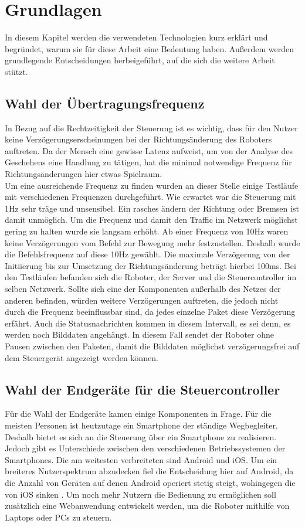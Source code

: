 \chapter{Grundlagen}
\label{ch:Grundlagen}

In diesem Kapitel werden die verwendeten Technologien kurz erklärt und begründet, warum sie für diese Arbeit eine Bedeutung haben. Außerdem werden grundlegende Entscheidungen herbeigeführt, auf die sich die weitere Arbeit stützt.

\section{Wahl der Übertragungsfrequenz}
In Bezug auf die Rechtzeitigkeit der Steuerung ist es wichtig, dass für den Nutzer keine Verzögerungserscheinungen bei der Richtungsänderung des Roboters auftreten. Da der Mensch eine gewisse Latenz aufweist, um von der Analyse des Geschehens eine Handlung zu tätigen, hat die minimal notwendige Frequenz für Richtungsänderungen hier etwas Spielraum. \\
Um eine ausreichende Frequenz zu finden wurden an dieser Stelle einige Testläufe mit verschiedenen Frequenzen durchgeführt. Wie erwartet war die Steuerung mit 1Hz sehr träge und unsensibel. Ein rasches ändern der Richtung oder Bremsen ist damit unmöglich. Um die Frequenz und damit den Traffic im Netzwerk möglichst gering zu halten wurde sie langsam erhöht. Ab einer Frequenz von 10Hz waren keine Verzögerungen vom Befehl zur Bewegung mehr festzustellen. Deshalb wurde die Befehlsfrequenz auf diese 10Hz gewählt. Die maximale Verzögerung von der Initiierung bis zur Umsetzung der Richtungsänderung beträgt hierbei 100ms. Bei den Testläufen befanden sich die Roboter, der Server und die Steuercontroller im selben Netzwerk. Sollte sich eine der Komponenten außerhalb des Netzes der anderen befinden, würden weitere Verzögerungen auftreten, die jedoch nicht durch die Frequenz beeinflussbar sind, da jedes einzelne Paket diese Verzögerung erfährt. Auch die Statusnachrichten kommen in diesem Intervall, es sei denn, es werden noch Bilddaten angehängt. In diesem Fall sendet der Roboter ohne Pausen zwischen den Paketen, damit die Bilddaten möglichst verzögerungsfrei auf dem Steuergerät angezeigt werden können. 


\section{Wahl der Endgeräte für die Steuercontroller}
\label{sec:wahl_endgeraete}
Für die Wahl der Endgeräte kamen einige Komponenten in Frage. Für die meisten Personen ist heutzutage ein Smartphone der ständige Wegbegleiter. Deshalb bietet es sich an die Steuerung über ein Smartphone zu realisieren. Jedoch gibt es Unterschiede zwischen den verschiedenen Betriebssystemen der Smartphones. Die am weitesten verbreiteten sind Android und iOS. Um ein breiteres Nutzerspektrum abzudecken fiel die Entscheidung hier auf Android, da die Anzahl von Geräten auf denen Android operiert stetig steigt, wohingegen die von iOS sinken \cite{ANDROIDIOS}. Um noch mehr Nutzern die Bedienung zu ermöglichen soll zusätzlich eine Webanwendung entwickelt werden, um die Roboter mithilfe von Laptops oder PCs zu steuern. 


